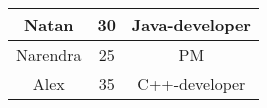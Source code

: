 \documentclass{article}
\begin{document}
\begin{tabular}{|c|c|c|}
\hline
Natan & 30 & Java-developer \\ \hline
Narendra & 25 & PM \\ \hline
Alex & 35 & C++-developer \\ \hline
\end{tabular}
\end{document}
